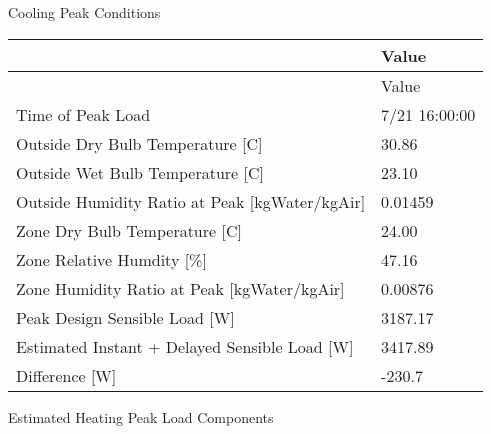 Cooling Peak Conditions

\begin{longtable}[c]{@{}ll@{}}
\toprule 
 & Value \tabularnewline
\midrule
\endfirsthead

\toprule 
 & Value \tabularnewline
\midrule
\endhead

Time of Peak Load & 7/21 16:00:00 \tabularnewline
Outside Dry Bulb Temperature [C] & 30.86 \tabularnewline
Outside Wet Bulb Temperature [C] & 23.10 \tabularnewline
Outside Humidity Ratio at Peak [kgWater/kgAir] & 0.01459 \tabularnewline
Zone Dry Bulb Temperature [C] & 24.00 \tabularnewline
Zone Relative Humdity [\%] & 47.16 \tabularnewline
Zone Humidity Ratio at Peak [kgWater/kgAir] & 0.00876 \tabularnewline
Peak Design Sensible Load [W] & 3187.17 \tabularnewline
Estimated Instant + Delayed Sensible Load [W] & 3417.89 \tabularnewline
Difference [W] & -230.7 \tabularnewline
\bottomrule
\end{longtable}

Estimated Heating Peak Load Components

